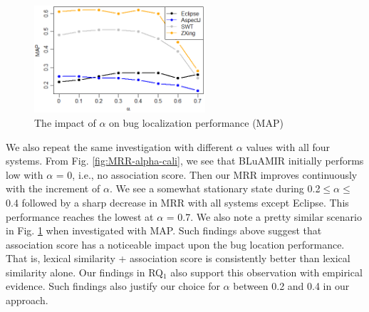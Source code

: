 \documentclass[conference]{IEEEtran}
\begin{document}
\begin{figure}[!t]
	\centering
	\includegraphics[width=2.5in]{alpha-calibration-map}
	\vspace{-.3cm}
	\caption{The impact of $\alpha$ on bug localization performance (MAP)}
	\label{fig:MAP-alpha-cali}
	\vspace{-.5cm}
\end{figure}
We also repeat the same investigation with different $\alpha$ values with all four systems. From Fig. \ref{fig:MRR-alpha-cali}, we see that BLuAMIR initially performs low with $\alpha$ = 0, i.e., no association score. Then our MRR improves continuously with the increment of $\alpha$. We see a somewhat stationary state during 0.2$\le\alpha\le$0.4 followed by a sharp decrease in MRR with all systems except Eclipse.
This performance reaches the lowest at $\alpha$ = 0.7.
We also note a pretty similar scenario in Fig. \ref{fig:MAP-alpha-cali} when investigated with MAP.
Such findings above suggest that association score has a noticeable impact upon the bug location performance. That is, lexical similarity + association score is consistently better than lexical similarity alone. Our findings in RQ$_1$ also support this observation with empirical evidence. Such findings also justify our choice for $\alpha$ between 0.2 and 0.4 in our approach. 


\end{document}
